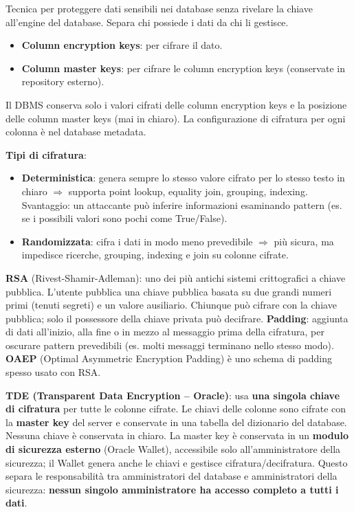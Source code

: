 \documentclass[a4paper,11pt]{article}
\begin{document}
\begin{definizione}
Tecnica per proteggere dati sensibili nei database senza rivelare la chiave all'engine del database. Separa chi possiede i dati da chi li gestisce.
\begin{itemize}
  \item \textbf{Column encryption keys}: per cifrare il dato.
  \item \textbf{Column master keys}: per cifrare le column encryption keys (conservate in repository esterno).
\end{itemize}
Il DBMS conserva solo i valori cifrati delle column encryption keys e la posizione delle column master keys (mai in chiaro). La configurazione di cifratura per ogni colonna \`{e} nel database metadata.

\textbf{Tipi di cifratura}:
\begin{itemize}
  \item \textbf{Deterministica}: genera sempre lo stesso valore cifrato per lo stesso testo in chiaro $\Rightarrow$ supporta point lookup, equality join, grouping, indexing. Svantaggio: un attaccante pu\`{o} inferire informazioni esaminando pattern (es. se i possibili valori sono pochi come True/False).
  \item \textbf{Randomizzata}: cifra i dati in modo meno prevedibile $\Rightarrow$ pi\`{u} sicura, ma impedisce ricerche, grouping, indexing e join su colonne cifrate.
\end{itemize}

\textbf{RSA} (Rivest-Shamir-Adleman): uno dei pi\`{u} antichi sistemi crittografici a chiave pubblica. L'utente pubblica una chiave pubblica basata su due grandi numeri primi (tenuti segreti) e un valore ausiliario. Chiunque pu\`{o} cifrare con la chiave pubblica; solo il possessore della chiave privata pu\`{o} decifrare. \textbf{Padding}: aggiunta di dati all'inizio, alla fine o in mezzo al messaggio prima della cifratura, per oscurare pattern prevedibili (es. molti messaggi terminano nello stesso modo). \textbf{OAEP} (Optimal Asymmetric Encryption Padding) \`{e} uno schema di padding spesso usato con RSA.

\textbf{TDE (Transparent Data Encryption -- Oracle)}: usa \textbf{una singola chiave di cifratura} per tutte le colonne cifrate. Le chiavi delle colonne sono cifrate con la \textbf{master key} del server e conservate in una tabella del dizionario del database. Nessuna chiave \`{e} conservata in chiaro. La master key \`{e} conservata in un \textbf{modulo di sicurezza esterno} (Oracle Wallet), accessibile solo all'amministratore della sicurezza; il Wallet genera anche le chiavi e gestisce cifratura/decifratura. Questo separa le responsabilit\`{a} tra amministratori del database e amministratori della sicurezza: \textbf{nessun singolo amministratore ha accesso completo a tutti i dati}.


\end{definizione}
\end{document}
